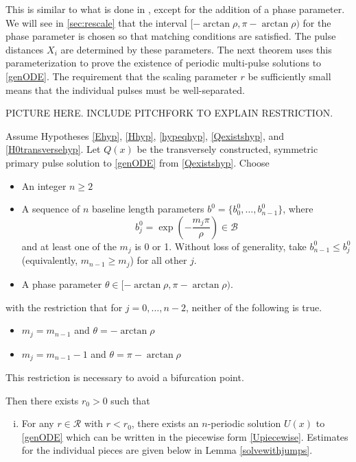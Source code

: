 \documentclass[thesis.tex]{subfiles}
\begin{document}
\noi This is similar to what is done in \cite{SandstedeStrut}, except for the addition of a phase parameter. We will see in \cref{sec:rescale} that the interval $[-\arctan \rho, \pi - \arctan \rho)$ for the phase parameter is chosen so that matching conditions are satisfied. The pulse distances $X_i$ are determined by these parameters. The next theorem uses this parameterization to prove the existence of periodic multi-pulse solutions to \eqref{genODE}. The requirement that the scaling parameter $r$ be sufficiently small means that the individual pulses must be well-separated. 

PICTURE HERE. INCLUDE PITCHFORK TO EXPLAIN RESTRICTION.

\begin{theorem}\label{perexist}
Assume Hypotheses \ref{Ehyp}, \ref{Hhyp}, \ref{hypeqhyp}, \ref{Qexistshyp}, and \ref{H0transversehyp}. Let $Q(x)$ be the transversely constructed, symmetric primary pulse solution to \eqref{genODE} from \cref{Qexistshyp}. Choose
\begin{itemize}
\item An integer $n \geq 2$ 
\item A sequence of $n$ baseline length parameters $b^0 = \{ b_0^0, \dots, b_{n-1}^0 \}$, where 
\[
b_j^0 = \exp\left(-\frac{m_j \pi}{\rho}\right) \in \mathcal{B}
\] 
and at least one of the $m_j$ is 0 or 1. Without loss of generality, take $b_{n-1}^0 \leq b_j^0$ (equivalently, $m_{n-1} \geq m_j$) for all other $j$.
\item A phase parameter $\theta \in [-\arctan \rho, \pi - \arctan \rho)$.
\end{itemize}
with the restriction that for $j = 0, \dots, n-2$, neither of the following is true.
\begin{itemize}
\item $m_j = m_{n-1}$ and $\theta = -\arctan \rho$
\item $m_j = m_{n-1} - 1$ and $\theta = \pi-\arctan \rho$
\end{itemize}
This restriction is necessary to avoid a bifurcation point. 

Then there exists $r_0 > 0$ such that
\begin{enumerate}[(i)]

\item For any $r \in \mathcal{R}$ with $r < r_0$, there exists an $n$-periodic solution $U(x)$ to \eqref{genODE} which can be written in the piecewise form \eqref{Upiecewise}. Estimates for the individual pieces are given below in Lemma \ref{solvewithjumps}.


\end{enumerate}
\end{theorem}
\end{document}

